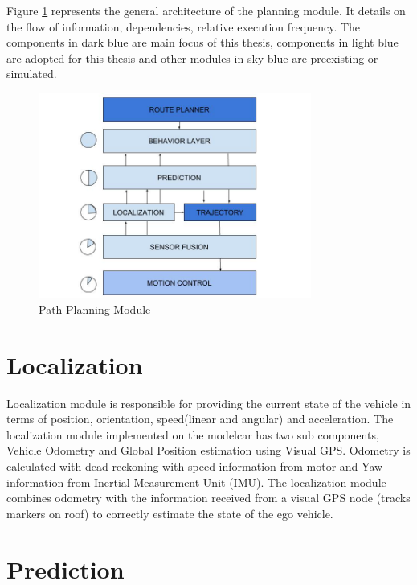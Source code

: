 Figure \ref{path_planner} represents the general architecture of the planning module. It details on the flow of information, dependencies, relative execution frequency. The components in dark blue are main focus of this thesis, components in light blue are adopted for this thesis and other modules in sky blue are preexisting or simulated. 
\begin{figure}[h]
    \centering
    \includegraphics[width=0.8\textwidth]{Images/path_planner.jpg}
    \caption{Path Planning Module}
    \label{path_planner}
\end{figure}

\section{Localization} \label{localization}

Localization module is responsible for providing the current state of the vehicle in terms of position, orientation, speed(linear and angular) and acceleration. The localization module implemented on the modelcar has two sub components, Vehicle Odometry and Global Position estimation using Visual GPS. Odometry is calculated with dead reckoning \cite{dead_reckoning} with speed information from motor and Yaw information from Inertial Measurement Unit (IMU). The localization module combines odometry with the information received from a visual GPS node (tracks markers on roof) to correctly estimate the state of the ego vehicle. 

\section{Prediction} \label{prediction}

